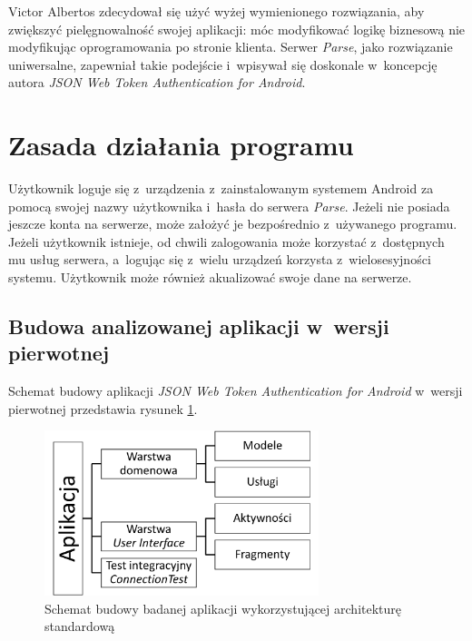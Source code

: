 Victor Albertos zdecydował się użyć wyżej wymienionego rozwiązania, aby zwiększyć pielęgnowalność swojej aplikacji: móc modyfikować logikę biznesową nie modyfikując oprogramowania po stronie klienta. Serwer \textit{Parse}, jako rozwiązanie uniwersalne, zapewniał takie podejście i~wpisywał się doskonale w~koncepcję autora \textit{JSON Web Token Authentication for Android}.

\section{Zasada działania programu}
Użytkownik loguje się z~urządzenia z~zainstalowanym systemem Android za pomocą swojej nazwy użytkownika i~hasła do serwera \textit{Parse}. Jeżeli nie posiada jeszcze konta na serwerze, może założyć je bezpośrednio z~używanego programu. Jeżeli użytkownik istnieje, od chwili zalogowania może korzystać z~dostępnych mu usług serwera, a~logując się z~wielu urządzeń korzysta z~wielosesyjności systemu.  Użytkownik może również akualizować swoje dane na serwerze.


\subsection{Budowa analizowanej aplikacji w~wersji pierwotnej}
Schemat budowy aplikacji \textit{JSON Web Token Authentication for Android} w~wersji pierwotnej przedstawia rysunek \ref{fig:app_std}.

\begin{figure}[!htb]
    \centering
    \includegraphics[width=8cm]{imgs/ch6_app_st_diagram.png}
    \caption
{Schemat budowy badanej aplikacji wykorzystującej architekturę standardową}
    \label{fig:app_std}
\end{figure} 

